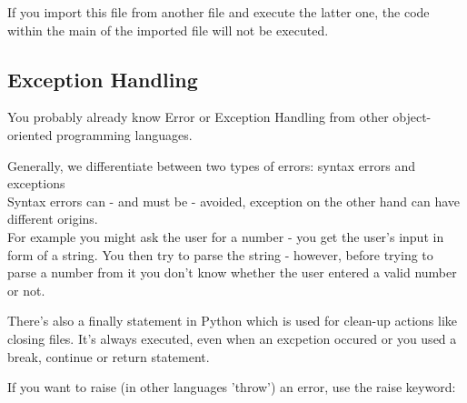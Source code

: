 
        If you import this file from another file and execute the latter one, the code within the
        main of the imported file will not be executed.


    \subsection{Exception Handling}
        You probably already know Error or Exception Handling from other object-oriented
        programming languages.

        Generally, we differentiate between two types of errors: syntax errors and exceptions \\
        Syntax errors can - and must be - avoided, exception on the other hand can have different
        origins. \\
        For example you might ask the user for a number - you get the user's input in form
        of a string. You then try to parse the string - however, before trying to parse a number
        from it you don't know whether the user entered a valid number or not.

        There's also a finally statement in Python which is used for clean-up actions like
        closing files. It's always executed, even when an excpetion occured or you used a break,
        continue or return statement.


        If you want to raise (in other languages 'throw') an error, use the raise keyword:
